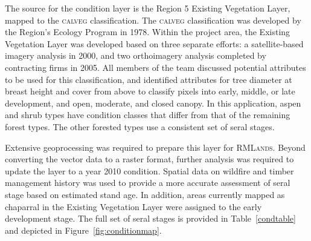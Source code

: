 The source for the condition layer is the Region 5 Existing Vegetation Layer, mapped to the \textsc{calveg} classification. The \textsc{calveg} classification was developed by the Region's Ecology Program in 1978. Within the project area, the Existing Vegetation Layer was developed based on three separate efforts: a satellite-based imagery analysis in 2000, and two orthoimagery analysis completed by contracting firms in 2005. All members of the team discussed potential attributes to be used for this classification, and identified attributes for tree diameter at breast height and cover from above to classify pixels into early, middle, or late development, and open, moderate, and closed canopy. In this application, aspen and shrub types have condition classes that differ from that of the remaining forest types. The other forested types use a consistent set of seral stages.

Extensive geoprocessing was required to prepare this layer for \textsc{RMLands}. Beyond converting the vector data to a raster format, further analysis was required to update the layer to a year 2010 condition. Spatial data on wildfire and timber management history was used to provide a more accurate assessment of seral stage based on estimated stand age. In addition, areas currently mapped as chaparral in the Existing Vegetation Layer were assigned to the early development stage. The full set of seral stages is provided in Table~\ref{condtable} and depicted in Figure~\ref{fig:conditionmap}.


